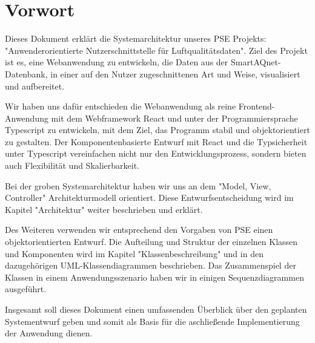 \section{Vorwort}
Dieses Dokument erklärt die Systemarchitektur unseres PSE Projekts: "Anwenderorientierte Nutzerschnittstelle für Luftqualitätsdaten". Ziel des Projekt ist es, eine Webanwendung zu entwickeln, die Daten aus der \gls{SmartAQnet}-Datenbank, in einer auf den Nutzer zugeschnittenen Art und Weise, visualisiert und aufbereitet.

Wir haben uns dafür entschieden die Webanwendung als reine Frontend-Anwendung mit dem Webframework React und unter der Programmiersprache Typescript zu entwickeln, mit dem Ziel, das Programm stabil und objektorientiert zu gestalten. Der Komponentenbasierte Entwurf mit React und die Typsicherheit unter Typescript vereinfachen nicht nur den Entwicklungsprozess, sondern bieten auch Flexibilität und Skalierbarkeit.

Bei der groben Systemarchitektur haben wir uns an dem "Model, View, Controller" Architekturmodell orientiert. Diese Entwurfsentscheidung wird im Kapitel "Architektur" weiter beschrieben und erklärt.

Des Weiteren verwenden wir entsprechend den Vorgaben von PSE einen objektorientierten Entwurf. Die Aufteilung und Struktur der einzelnen Klassen und Komponenten wird im Kapitel "Klassenbeschreibung" und in den dazugehörigen UML-Klassendiagrammen beschrieben.
Das Zusammenspiel der Klassen in einem Anwendungsszenario haben wir in einigen Sequenzdiagrammen ausgeführt.

Insgesamt soll dieses Dokument einen umfassenden Überblick über den geplanten Systementwurf geben und somit als Basis für die aschließende Implementierung der Anwendung dienen.

